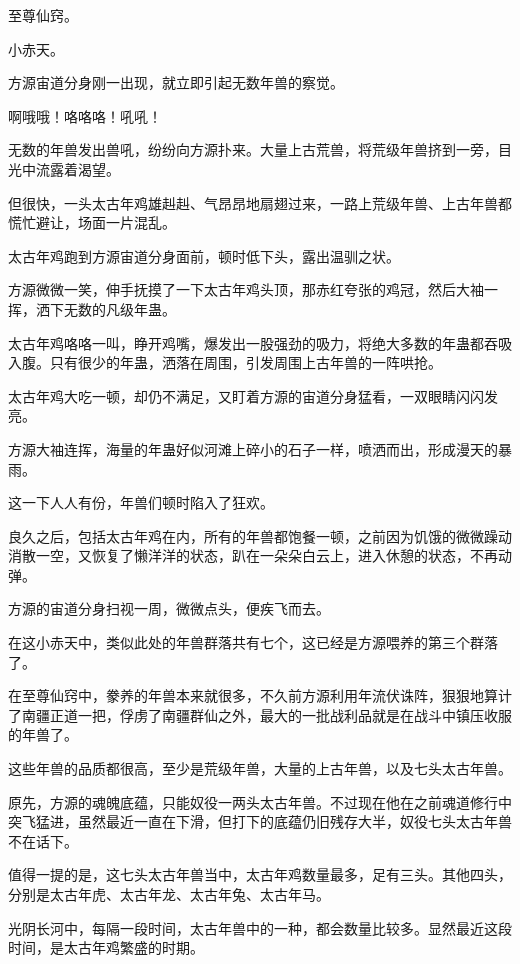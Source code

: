 
\begin{this_body}

至尊仙窍。

小赤天。

方源宙道分身刚一出现，就立即引起无数年兽的察觉。

啊哦哦！咯咯咯！吼吼！

无数的年兽发出兽吼，纷纷向方源扑来。大量上古荒兽，将荒级年兽挤到一旁，目光中流露着渴望。

但很快，一头太古年鸡雄赳赳、气昂昂地扇翅过来，一路上荒级年兽、上古年兽都慌忙避让，场面一片混乱。

太古年鸡跑到方源宙道分身面前，顿时低下头，露出温驯之状。

方源微微一笑，伸手抚摸了一下太古年鸡头顶，那赤红夸张的鸡冠，然后大袖一挥，洒下无数的凡级年蛊。

太古年鸡咯咯一叫，睁开鸡嘴，爆发出一股强劲的吸力，将绝大多数的年蛊都吞吸入腹。只有很少的年蛊，洒落在周围，引发周围上古年兽的一阵哄抢。

太古年鸡大吃一顿，却仍不满足，又盯着方源的宙道分身猛看，一双眼睛闪闪发亮。

方源大袖连挥，海量的年蛊好似河滩上碎小的石子一样，喷洒而出，形成漫天的暴雨。

这一下人人有份，年兽们顿时陷入了狂欢。

良久之后，包括太古年鸡在内，所有的年兽都饱餐一顿，之前因为饥饿的微微躁动消散一空，又恢复了懒洋洋的状态，趴在一朵朵白云上，进入休憩的状态，不再动弹。

方源的宙道分身扫视一周，微微点头，便疾飞而去。

在这小赤天中，类似此处的年兽群落共有七个，这已经是方源喂养的第三个群落了。

在至尊仙窍中，豢养的年兽本来就很多，不久前方源利用年流伏诛阵，狠狠地算计了南疆正道一把，俘虏了南疆群仙之外，最大的一批战利品就是在战斗中镇压收服的年兽了。

这些年兽的品质都很高，至少是荒级年兽，大量的上古年兽，以及七头太古年兽。

原先，方源的魂魄底蕴，只能奴役一两头太古年兽。不过现在他在之前魂道修行中突飞猛进，虽然最近一直在下滑，但打下的底蕴仍旧残存大半，奴役七头太古年兽不在话下。

值得一提的是，这七头太古年兽当中，太古年鸡数量最多，足有三头。其他四头，分别是太古年虎、太古年龙、太古年兔、太古年马。

光阴长河中，每隔一段时间，太古年兽中的一种，都会数量比较多。显然最近这段时间，是太古年鸡繁盛的时期。


\end{this_body}
